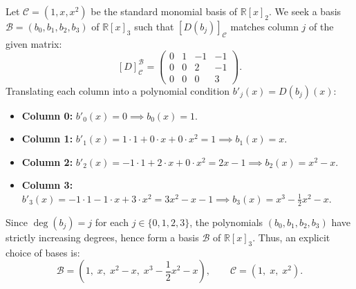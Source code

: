 \begin{exercisesolution*}
\label{sol:differentiation_customized_bases}
Let $\mathcal{C} = (1, x, x^2)$ be the standard monomial basis of $\mathbb{R}[x]_2$.
We seek a basis $\mathcal{B} = (b_0, b_1, b_2, b_3)$ of $\mathbb{R}[x]_3$ such that $[D(b_j)]_{\mathcal{C}}$ matches column $j$ of the given matrix:
\[
[D]_{\mathcal{C}}^{\mathcal{B}} =
\begin{pmatrix}
0 & 1 & -1 & -1 \\
0 & 0 & 2 & -1 \\
0 & 0 & 0 & 3
\end{pmatrix}.
\]
Translating each column into a polynomial condition $b'_j(x) = D(b_j)(x)$:
\begin{itemize}
    \item \textbf{Column 0:} $b'_0(x) = 0 \implies b_0(x) = 1$.
    \item \textbf{Column 1:} $b'_1(x) = 1 \cdot 1 + 0 \cdot x + 0 \cdot x^2 = 1 \implies b_1(x) = x$.
    \item \textbf{Column 2:} $b'_2(x) = -1 \cdot 1 + 2 \cdot x + 0 \cdot x^2 = 2x - 1 \implies b_2(x) = x^2 - x$.
    \item \textbf{Column 3:} $b'_3(x) = -1 \cdot 1 - 1 \cdot x + 3 \cdot x^2 = 3x^2 - x - 1 \implies b_3(x) = x^3 - \frac{1}{2}x^2 - x$.
\end{itemize}
Since $\deg(b_j) = j$ for each $j \in \{0, 1, 2, 3\}$, the polynomials $(b_0, b_1, b_2, b_3)$ have strictly increasing degrees, hence form a basis $\mathcal{B}$ of $\mathbb{R}[x]_3$.
Thus, an explicit choice of bases is:
\[
\mathcal{B} = \left(1, \; x, \; x^2 - x, \; x^3 - \frac{1}{2}x^2 - x\right), \qquad \mathcal{C} = (1, \; x, \; x^2).
\]
\end{exercisesolution*}

